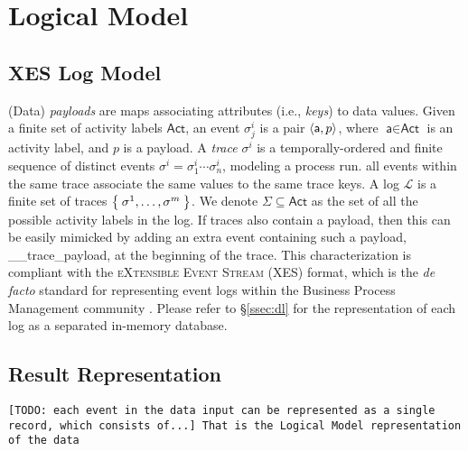 \section{Logical Model}
\subsection{XES Log Model}\label{sec:XES}

(Data) \textit{payloads} are maps  associating attributes (i.e., \textit{keys}) to data values. %
Given a finite set of activity labels $\textsf{Act}$, an event $\sigma_j^{i}$ is a pair $\Braket{\textsf{a},p}$, where $\textsf{a}\in\textsf{Act}$ is an activity label, and $p$ is a payload. %
A \textit{trace} $\sigma^i$ is a temporally-ordered and finite sequence of distinct events $\sigma^i=\sigma_1^i\cdots\sigma_n^i$, modeling a process run. %
all events within the same trace associate the same values to the same trace keys. %
A log $\mathcal{L}$ is a finite set of traces $\Set{\sigma^1,\dots,\sigma^m}$. We denote  $\Sigma\subseteq\textsf{Act}$ as the set of all the possible activity labels in the log. If traces also contain a payload, then this can be easily mimicked by adding an extra event containing such a payload, \textsf{\_\_trace\_payload}, at the beginning of the trace. This  characterization \cite{bpm21} is compliant with the \textsc{eXtensible Event Stream} (XES) format, which is the \textit{de facto} standard for representing event logs within the Business Process Management community \cite{XES}. Please refer to \S\ref{ssec:dl} for the representation of each log as a separated in-memory database.

\subsection{Result Representation}
\texttt{\color{red}[TODO: each event in the data input can be represented as a single record, which consists of...] That is the Logical Model representation of the data}

